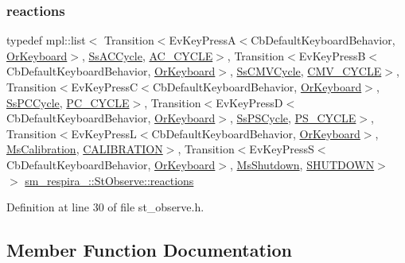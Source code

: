 \subsubsection{\texorpdfstring{reactions}{reactions}}
{\footnotesize\ttfamily typedef mpl\+::list$<$ Transition$<$Ev\+Key\+PressA$<$Cb\+Default\+Keyboard\+Behavior, \hyperlink{classsm__respira__1_1_1OrKeyboard}{Or\+Keyboard}$>$, \hyperlink{structsm__respira__1_1_1SsACCycle}{Ss\+A\+C\+Cycle}, \hyperlink{structsm__respira__1_1_1StObserve_1_1AC__CYCLE}{A\+C\+\_\+\+C\+Y\+C\+LE}$>$, Transition$<$Ev\+Key\+PressB$<$Cb\+Default\+Keyboard\+Behavior, \hyperlink{classsm__respira__1_1_1OrKeyboard}{Or\+Keyboard}$>$, \hyperlink{structsm__respira__1_1_1SsCMVCycle}{Ss\+C\+M\+V\+Cycle}, \hyperlink{structsm__respira__1_1_1StObserve_1_1CMV__CYCLE}{C\+M\+V\+\_\+\+C\+Y\+C\+LE}$>$, Transition$<$Ev\+Key\+PressC$<$Cb\+Default\+Keyboard\+Behavior, \hyperlink{classsm__respira__1_1_1OrKeyboard}{Or\+Keyboard}$>$, \hyperlink{structsm__respira__1_1_1SsPCCycle}{Ss\+P\+C\+Cycle}, \hyperlink{structsm__respira__1_1_1StObserve_1_1PC__CYCLE}{P\+C\+\_\+\+C\+Y\+C\+LE}$>$, Transition$<$Ev\+Key\+PressD$<$Cb\+Default\+Keyboard\+Behavior, \hyperlink{classsm__respira__1_1_1OrKeyboard}{Or\+Keyboard}$>$, \hyperlink{structsm__respira__1_1_1SsPSCycle}{Ss\+P\+S\+Cycle}, \hyperlink{structsm__respira__1_1_1StObserve_1_1PS__CYCLE}{P\+S\+\_\+\+C\+Y\+C\+LE}$>$, Transition$<$Ev\+Key\+PressL$<$Cb\+Default\+Keyboard\+Behavior, \hyperlink{classsm__respira__1_1_1OrKeyboard}{Or\+Keyboard}$>$, \hyperlink{classsm__respira__1_1_1MsCalibration}{Ms\+Calibration}, \hyperlink{structsm__respira__1_1_1StObserve_1_1CALIBRATION}{C\+A\+L\+I\+B\+R\+A\+T\+I\+ON}$>$, Transition$<$Ev\+Key\+PressS$<$Cb\+Default\+Keyboard\+Behavior, \hyperlink{classsm__respira__1_1_1OrKeyboard}{Or\+Keyboard}$>$, \hyperlink{classsm__respira__1_1_1MsShutdown}{Ms\+Shutdown}, \hyperlink{structsm__respira__1_1_1StObserve_1_1SHUTDOWN}{S\+H\+U\+T\+D\+O\+WN}$>$ $>$ \hyperlink{structsm__respira__1_1_1StObserve_a442d7ab309557e1d6793525d4df07d6d}{sm\+\_\+respira\+\_\+::\+St\+Observe\+::reactions}}



Definition at line 30 of file st\+\_\+observe.\+h.



\subsection{Member Function Documentation}
\mbox{\label{structsm__respira__1_1_1StObserve_a4aa08a7d0471453573d7ad4f4d6797ed}} 
